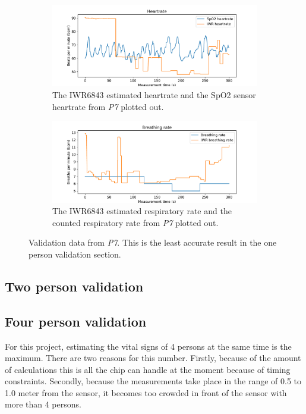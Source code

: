 \begin{figure}[t]
\begin{subfigure}{\textwidth}
  \centering
  \includegraphics[width=\linewidth]{figures/validation/tim_heart.pdf}  
  \caption{The IWR6843 estimated heartrate and the SpO2 sensor heartrate from \emph{P7} plotted out.}
  \label{fig:tim_heart}
\end{subfigure}
\begin{subfigure}{\textwidth}
  \centering
  \includegraphics[width=\linewidth]{figures/validation/tim_breath.pdf}  
  \caption{The IWR6843 estimated respiratory rate and the counted respiratory rate from \emph{P7} plotted out.}
  \label{fig:tim_breath}
\end{subfigure}
\caption{Validation data from \emph{P7}. This is the least accurate result in the one person validation section.}
\label{fig:tim_meas}
\end{figure}

\subsection{Two person validation}

\subsection{Four person validation}
For this project, estimating the vital signs of 4 persons at the same time is the maximum. There are two reasons for this number. Firstly, because of the amount of calculations this is all the chip can handle at the moment because of timing constraints. Secondly, because the measurements take place in the range of 0.5 to 1.0 meter from the sensor, it becomes too crowded in front of the sensor with more than 4 persons. 

